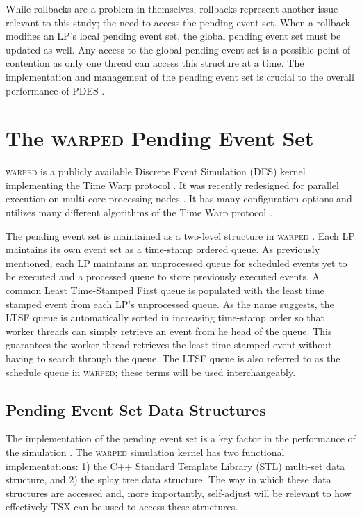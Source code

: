 \documentclass[11pt]{book}
\begin{document}
While rollbacks are a problem in themselves, rollbacks represent another issue relevant to
this study; the need to access the pending event set.  When a rollback modifies an LP's
local pending event set, the global pending event set must be updated as well.  Any access
to the global pending event set is a possible point of contention as only one thread can
access this structure at a time.  The implementation and management of the pending event
set is crucial to the overall performance of PDES \cite{twpes}.

\section{The \textsc{warped} Pending Event Set}

\textsc{warped} is a publicly available Discrete Event Simulation (DES) kernel implementing the
Time Warp protocol \cite{martin,fujimoto}.  It was recently redesigned for parallel
execution on multi-core processing nodes \cite{muthalagu}.  It has many configuration
options and utilizes many different algorithms of the Time Warp protocol \cite{fujimoto}.

The pending event set is maintained as a two-level structure in \textsc{warped}
\cite{dickman}.  Each LP maintains its own event set as a time-stamp ordered
queue.  As previously mentioned, each LP maintains an unprocessed queue for
scheduled events yet to be executed and a processed queue to store previously
executed events.  A common Least Time-Stamped First queue is populated with the
least time stamped event from each LP's unprocessed queue.  As the name
suggests, the LTSF queue is automatically sorted in increasing time-stamp order
so that worker threads can simply retrieve an event from he head of the queue.
This guarantees the worker thread retrieves the least time-stamped event without
having to search through the queue. The LTSF queue is also referred to as the
schedule queue in \textsc{warped}; these terms will be used interchangeably.

\subsection{Pending Event Set Data Structures}

The implementation of the pending event set is a key factor in the performance
of the simulation \cite{twpes}.  The \textsc{warped} simulation kernel has two
functional implementations: 1) the C++ Standard Template Library (STL) multi-set
data structure, and 2) the splay tree data structure.  The way in which these
data structures are accessed and, more importantly, self-adjust will be relevant
to how effectively TSX can be used to access these structures.
\end{document}
